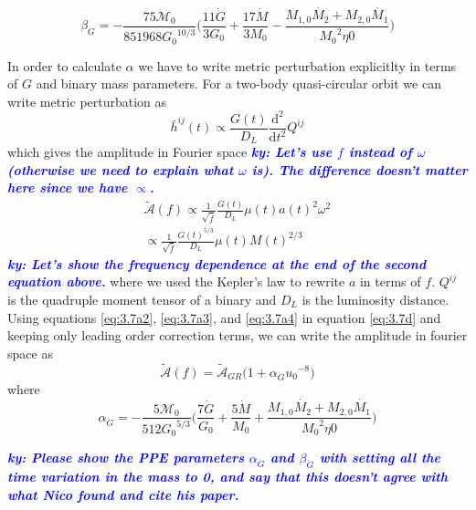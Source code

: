 \documentclass[11pt]{article}
\newcommand{\ky}[1]{\textcolor{blue}{\it{\textbf{ky: #1}}} }
\begin{document}
 \begin{equation}
 \beta_{\dot{G}}=-\frac{75 \mathcal{M}_0}{851968 {G_0}^{10/3}} \bigg(\frac{11 \dot{G}}{3 G_0} + \frac{17 \dot{M}}{3M_0}-\frac{M_{1,0}\dot{M_2}+M_{2,0}\dot{M_1}}{{M_0}^2 \eta0}\bigg)
  \end{equation}
 
 \hspace*{15.5pt}In order to calculate $\alpha$ we have to write metric perturbation explicitlty in terms of $G$ and binary mass parameters. For a two-body quasi-circular orbit we can write metric perturbation as \cite{Blanchet:2002av}
 \begin{equation}
\bar{h}^{ij}(t)\propto \frac{G(t)}{D_L}\frac{\mathrm{d^2} }{\mathrm{d} t^2}Q^{ij}
 \end{equation}
which gives the amplitude in Fourier space \ky{Let's use $f$ instead of $\omega$ (otherwise we need to explain what $\omega$ is). The difference doesn't matter here since we have $\propto$.}
\begin{align}\label{eq:3.7d}
\tilde{\mathcal{A}}(f)\propto\frac{1}{\sqrt{\dot{f}}}\frac{G(t)}{D_L}\mu(t) a(t)^2\omega^2\nonumber\\\propto\frac{1}{\sqrt{\dot{f}}}\frac{G(t)^{5/3}}{D_L}\mu(t){M(t)}^{2/3}
\end{align} 
\ky{Let's show the frequency dependence at the end of the second equation above.}
where we used the Kepler's law to rewrite $a$ in terms of $f$.
 $Q^{ij}$ is the quadruple moment tensor of a binary and $D_L$ is the luminosity distance. Using equations \eqref{eq:3.7a2}, \eqref{eq:3.7a3}, and \eqref{eq:3.7a4} in equation \eqref{eq:3.7d} and keeping only leading order correction terms, we can write the amplitude in fourier space as
\begin{equation}
\tilde{\mathcal{A}}(f)=\tilde{\mathcal{A}}_{GR}\big(1+\alpha_{\dot{G}}{u_0}^{-8}\big)
\end{equation}
where
\begin{equation}
 \alpha_{\dot{G}}=-\frac{5\mathcal{M}_0}{512 {G_0}^{5/3}} \bigg(\frac{7 \dot{G}}{ G_0} + \frac{5\dot{M}}{M_0}+\frac{M_{1,0}\dot{M_2}+M_{2,0}\dot{M_1}}{{M_0}^2 \eta0}\bigg)
 \end{equation}
 
\ky{Please show the PPE parameters $\alpha_{\dot G}$ and $\beta_{\dot G}$ with setting all the time variation in the mass to 0, and say that this doesn't agree with what Nico found and cite his paper.} 
 
\end{document}
